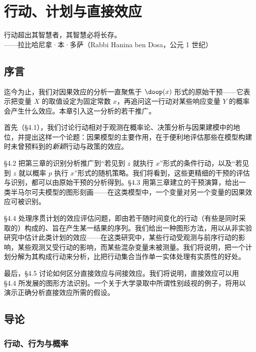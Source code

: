 \chapter{行动、计划与直接效应}

\begin{flushright}
\kaishu\small
行动超出其智慧者，其智慧必将长存。\\[2pt]
——拉比哈尼拿·本·多萨（Rabbi Hanina ben Dosa，公元 1 世纪）
\end{flushright}

\section*{序言}

迄今为止，我们对因果效应的分析一直聚焦于 $\doop(x)$ 形式的原始干预——它表示把变量 $X$ 的取值设定为固定常数 $x$，再追问这一行动对某些响应变量 $Y$ 的概率会产生什么效应。本章引入这一分析的若干推广。

首先（\S 4.1），我们讨论行动相对于观测在概率论、决策分析与因果建模中的地位，并提出这样一个论题：因果模型的主要作用，在于便利地评估那些在模型构建时未曾预料到的\emph{新颖}行动与政策的效应。

\S 4.2 把第三章的识别分析推广到“若见到 $z$ 就执行 $x$”形式的条件行动，以及“若见到 $z$ 就以概率 $p$ 执行 $x$”形式的随机策略。我们将看到，这些更精细的干预的评估与识别，都可以由原始干预的分析得到。\S 4.3 用第三章建立的干预演算，给出一类半马尔可夫模型的图形刻画——在这类模型中，一个变量对另一个变量的因果效应可被识别。

\S 4.4 处理序贯计划的效应评估问题，即由若干随时间变化的行动（有些是同时采取的）构成的、旨在产生某一结果的序列。我们给出一种图形方法，用以从非实验研究中估计此类计划的效应——在这类研究中，某些行动受观测与前序行动的影响，某些观测又受行动的影响，而某些混杂变量未被测量。我们将说明，把一个计划分解为其构成行动来分析，比把行动集合当作单一实体处理有实质性的好处。

最后，\S 4.5 讨论如何区分直接效应与间接效应。我们将说明，直接效应可以用 \S 4.4 所发展的图形方法识别。一个关于大学录取中所谓性别歧视的例子，将用以演示正确分析直接效应所需的假设。

\section{导论}

\subsection{行动、行为与概率}

